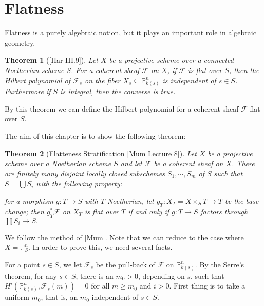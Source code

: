 \documentclass{article}
\theoremstyle{theorem}
\newtheorem{theorem}{Theorem}[section]
\begin{document}
    \section{Flatness}
    
    Flatness is a purely algebraic notion, but it plays an important role in algebraic geometry.
    
    \begin{theorem} [{[}Har III.9{]}] \label{flat_hilbert_polynomial}
        Let $X$ be a projective scheme over a connected Noetherian scheme $S$. For a coherent sheaf $\mathcal F$ on $X$, if $\mathcal F$ is flat over $S$, then the Hilbert polynomial of $\mathcal F_s$ on the fiber $X_s \subseteq \mathbb P^n_{k(s)}$ is independent of $s \in S$. Furthermore if $S$ is integral, then the converse is true.
    \end{theorem}
    
    By this theorem we can define the Hilbert polynomial for a coherent sheaf $\mathcal F$ flat over $S$.
    
    The aim of this chapter is to show the following theorem:
    
    \begin{theorem} [Flatteness Stratification {[}Mum Lecture 8{]}] \label{flattening_stratification}
        Let $X$ be a projective scheme over a Noetherian scheme $S$ and let $\mathcal F$ be a coherent sheaf on $X$. There are finitely many disjoint locally closed subschemes $S_1, \cdots, S_m$ of $S$ such that $S = \bigcup S_i$ with the following property:
        
        for a morphism $g: T \rightarrow S$ with $T$ Noetherian, let $g_T: X_T = X\times_S T \rightarrow T$ be the base change; then $g_T^*\mathcal F$ on $X_T$ is flat over $T$ if and only if $g: T \rightarrow S$ factors through $\coprod S_i \rightarrow S.$
    \end{theorem}
    
    We follow the method of {[Mum]}. Note that we can reduce to the case where $X = \mathbb P^n_S$. In order to prove this, we need several facts.
    
    For a point $s \!\in\! S$, we let $\mathcal F_s$ be the pull-back of $\mathcal F$ on $\mathbb P^n_{k(s)}.$ By the Serre's theorem, for any $s \!\in\! S$, there is an $m_0 \!>\! 0$, depending on $s$, such that $H^i(\mathbb P^n_{k(s)}, \mathcal F_s(m)) = 0$ for all $m \!\geq\! m_0$ and $i \!>\! 0$. First thing is to take a uniform $m_0$, that is, an $m_0$ independent of $s \in S$.
    
\end{document}

